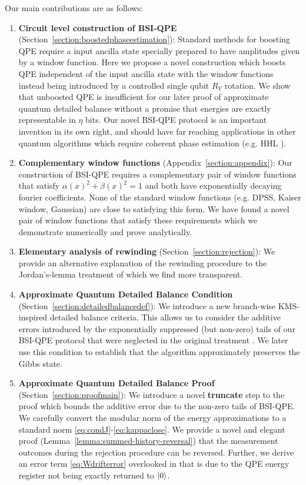\documentclass[aps,floatfix,10pt,amssymb,amsfont,amsmath,superscriptaddress,float,nofootinbib,longbibliography,nobalancelastpage,twocolumn]{revtex4-2}
\begin{document}
Our main contributions are as follows:
\begin{enumerate}
    \item \textbf{Circuit level construction of BSI-QPE} (Section~\ref{section:boostedphaseestimation}): Standard methods  \cite{babbush2018encoding, rendon2022effects, berry2024analyzing, greenaway2024case, patel2026optimal} for boosting QPE require a input ancilla state specially prepared to have amplitudes given by a window function. Here we propose a novel construction which boosts QPE independent of the input ancilla state with the window functions instead being introduced by a controlled single qubit $R_Y$ rotation. We show that unboosted QPE is insufficient for our later proof of approximate quantum detailed balance without a promise that energies are exactly representable in $\eta$ bits. Our novel BSI-QPE protocol is an important invention in its own right, and should have far reaching applications in other quantum algorithms which require coherent phase estimation (e.g. HHL \cite{harrow2009quantum}).
    \item \textbf{Complementary window functions} (Appendix~\ref{section:appendix}): Our construction of BSI-QPE requires a complementary pair of window functions that satisfy $\alpha(x)^2 + \beta(x)^2 =1$ and both have exponentially decaying fourier coefficients. None of the standard  window functions (e.g. DPSS, Kaiser window, Gaussian) are close to satisfying this form. We have found a novel pair of window functions that satisfy these requirements which we demonstrate numerically and prove analytically.
    \item \textbf{Elementary analysis of rewinding} (Section~\ref{section:rejection}): We provide an alternative explanation of the rewinding procedure to the Jordan's-lemma treatment of \cite{Temme_2011} which we find more transparent.
    \item \textbf{Approximate Quantum Detailed Balance Condition} (Section~\ref{section:detailedbalancedef}): We introduce a new branch-wise KMS-inspired detailed balance criteria. This allows us to consider the additive errors introduced by the exponentially suppressed (but non-zero) tails of our BSI-QPE protocol that were neglected in the original treatment \cite{Temme_2011}. We later use this condition to establish that the algorithm approximately preserves the Gibbs state.
    \item \textbf{Approximate Quantum Detailed Balance Proof} (Section~\ref{section:proofmain}): We introduce a novel \textbf{truncate} step to the proof which bounds the additive error due to the non-zero tails of BSI-QPE. We carefully convert the modular norm of the energy approximations to a standard norm \eqref{eq:condJ}-\eqref{eq:kappaclose}. We provide a novel and elegant proof (Lemma~\ref{lemma:summed-history-reversal}) that the measurement outcomes during the rejection procedure can be reversed. Further, we derive an error term \eqref{eq:Wdrifterror} overlooked in \cite{Temme_2011} that is due to the QPE energy register not being exactly returned to $\ket{0}$.

\end{enumerate}
\end{document}
